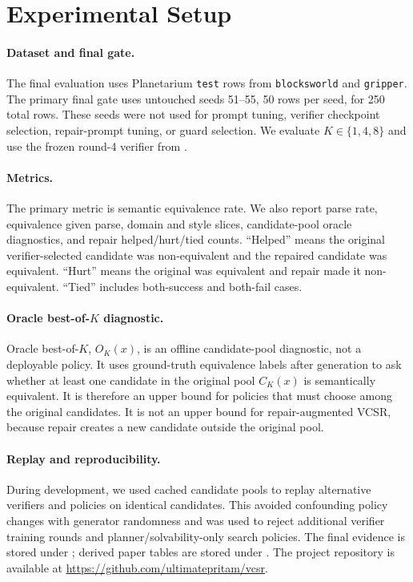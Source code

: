 \documentclass[11pt]{article}
\newcommand{\vcsr}{\textsc{VCSR}\xspace}
\begin{document}
\section{Experimental Setup}

\paragraph{Dataset and final gate.}
The final evaluation uses Planetarium \texttt{test} rows from
\texttt{blocksworld} and \texttt{gripper}. The primary final gate uses untouched
seeds 51--55, 50 rows per seed, for 250 total rows. These seeds were not used
for prompt tuning, verifier checkpoint selection, repair-prompt tuning, or
guard selection. We evaluate $K \in \{1,4,8\}$ and use the frozen round-4
verifier from .

\paragraph{Metrics.}
The primary metric is semantic equivalence rate. We also report parse rate,
equivalence given parse, domain and style slices, candidate-pool oracle
diagnostics, and repair helped/hurt/tied counts. ``Helped'' means the original
verifier-selected candidate was non-equivalent and the repaired candidate was
equivalent. ``Hurt'' means the original was equivalent and repair made it
non-equivalent. ``Tied'' includes both-success and both-fail cases.

\paragraph{Oracle best-of-$K$ diagnostic.}
Oracle best-of-$K$, \(O_K(x)\), is an offline candidate-pool diagnostic, not a
deployable policy. It uses ground-truth equivalence labels after generation to
ask whether at least one candidate in the original pool \(C_K(x)\) is
semantically equivalent. It is therefore an upper bound for policies that must
choose among the original candidates. It is not an upper bound for
repair-augmented \vcsr, because repair creates a new candidate outside the
original pool.

\paragraph{Replay and reproducibility.}
During development, we used cached candidate pools to replay alternative
verifiers and policies on identical candidates. This avoided confounding policy
changes with generator randomness and was used to reject additional verifier
training rounds and planner/solvability-only search policies. The final
evidence is stored under
; derived paper tables are stored
under . The project repository is available at
\url{https://github.com/ultimatepritam/vcsr}.
\end{document}
